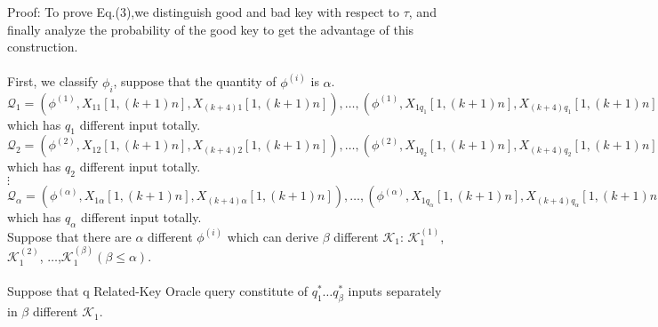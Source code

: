 \documentclass{article}
\begin{document}
Proof:
To prove Eq.(3),we distinguish good and bad key with respect to $\tau$, and finally analyze the probability of the good key to get the advantage of this construction.\\
\\
First, we classify $\phi_{i}$, suppose that the quantity of $\phi^{(i)}$ is $\alpha$.\\
$\mathcal{Q}_{1}={(\phi^{(1)},X_{11}[1,(k+1)n],X_{(k+4)1}[1,(k+1)n]),\dots,(\phi^{(1)},X_{1q_{1}}[1,(k+1)n],X_{(k+4)q_{1}}[1,(k+1)n])}$ which has $q_{1}$ different input totally.\\
$\mathcal{Q}_{2}={(\phi^{(2)},X_{12}[1,(k+1)n],X_{(k+4)2}[1,(k+1)n]),\dots,(\phi^{(2)},X_{1q_{2}}[1,(k+1)n],X_{(k+4)q_{2}}[1,(k+1)n])}$    which has $q_{2}$ different input totally.\\
\quad \quad $\vdots$ \\
$\mathcal{Q}_{\alpha}={(\phi^{(\alpha)},X_{1\alpha}[1,(k+1)n],X_{(k+4)\alpha}[1,(k+1)n]),\dots,(\phi^{(\alpha)},X_{1q_{\alpha}}[1,(k+1)n],X_{(k+4)q_{\alpha}}[1,(k+1)n])}$ which has $q_{\alpha}$ different input totally.\\

Suppose that there are $\alpha$ different $\phi^{(i)}$ which can derive $\beta$ different $\mathcal{K}_{1}$: $\mathcal{K}_{1}^{(1)}$, $\mathcal{K}_{1}^{(2)}$, $\dots$,$\mathcal{K}_{1}^{(\beta)}$$(\beta\leq \alpha)$.\\\\
Suppose that q Related-Key Oracle query constitute of $q_{1}^{\ast} \dots q_{\beta}^{\ast}$ inputs separately in $\beta$ different $\mathcal{K}_{1}$.\\
\\
\end{document}
